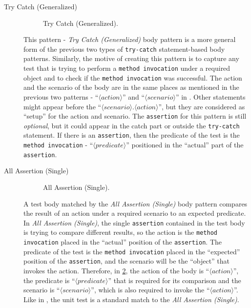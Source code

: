 \documentclass[proposal.tex]{subfiles}
\begin{document}
\begin{description}
\item[Try Catch (Generalized)] 

\begin{figure}[t]
\centering
    \begin{subfigure}{0.65\textwidth}
    \end{subfigure}
\caption{Try Catch (Generalized).}
\label{tc_any}
\end{figure}

This pattern - \textit{Try Catch (Generalized)} body pattern is a more general form of the previous two types of \texttt{try-catch} statement-based body patterns.
%
Similarly, the motive of creating this pattern is to capture any test that is trying to perform a \texttt{method invocation} under a required object and to check if the \texttt{method invocation} was successful.
%
The action and the scenario of the body are in the same places as mentioned in the previous two patterns - \enquote{$\langle action \rangle$} and \enquote{$\langle scenario \rangle$} in .
%
Other statements might appear before the \enquote{$\langle scenario \rangle.\langle action \rangle$}, but they are considered as \enquote{setup} for the action and scenario.
%
The \texttt{assertion} for this pattern is still \emph{optional}, but it could appear in the catch part or outside the \texttt{try-catch} statement.
%
If there is an \texttt{assertion}, then the predicate of the test is the \texttt{method invocation} - \enquote{$\langle predicate \rangle$} positioned in the \enquote{actual} part of the \texttt{assertion}.


\item[All Assertion (Single)] 

\begin{figure}[t]
\centering
    \begin{subfigure}{0.7\textwidth}
    \end{subfigure}
\caption{All Assertion (Single).}
\label{AllA_single}
\end{figure}

A test body matched by the \textit{All Assertion (Single)} body pattern compares the result of an action under a required scenario to an expected predicate.
%
In \textit{All Assertion (Single)}, the single \texttt{assertion} contained in the test body is trying to compare different results, so the action is the \texttt{method invocation} placed in the \enquote{actual} position of the \texttt{assertion}.
%
The predicate of the test is the \texttt{method invocation} placed in the \enquote{expected} position of the \texttt{assertion}, and the scenario will be the \enquote{object} that invokes the action. 
%
Therefore, in \cref{AllA_single}, the action of the body is \enquote{$\langle action \rangle$}, the predicate is \enquote{$\langle predicate \rangle$} that is required for its comparison and the scenario is \enquote{$\langle scenario \rangle$}, which is also required to invoke the \enquote{$\langle action \rangle$}.
%
Like in , the unit test is a standard match to the \textit{All Assertion (Single)}.



\end{description}
\end{document}
